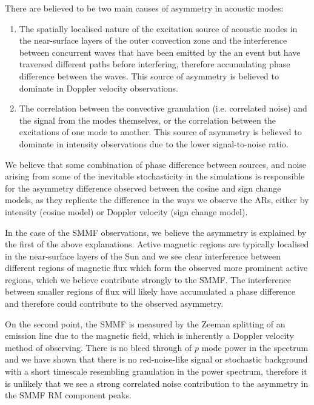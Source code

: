 There are believed to be two main causes of asymmetry in acoustic modes:

\begin{enumerate}
	\item{The spatially localised nature of the excitation source of acoustic modes in the near-surface layers of the outer convection zone and the interference between concurrent waves that have been emitted by the an event but have traversed different paths before interfering, therefore accumulating phase difference between the waves. This source of asymmetry is believed to dominate in Doppler velocity observations.}
	
	\item{The correlation between the convective granulation (i.e. correlated noise) and the signal from the modes themselves, or the correlation between the excitations of one mode to another. This source of asymmetry is believed to dominate in intensity observations due to the lower signal-to-noise ratio.}
\end{enumerate}

We believe that some combination of phase difference between sources, and noise arising from some of the inevitable stochasticity in the simulations is responsible for the asymmetry difference observed between the cosine and sign change models, as they replicate the difference in the ways we observe the ARs, either by intensity (cosine model) or Doppler velocity (sign change model).

In the case of the SMMF observations, we believe the asymmetry is explained by the first of the above explanations. Active magnetic regions are typically localised in the near-surface layers of the Sun and we see clear interference between different regions of magnetic flux which form the observed more prominent active regions, which we believe contribute strongly to the SMMF. The interference between smaller regions of flux will likely have accumulated a phase difference and therefore could contribute to the observed asymmetry. 

On the second point, the SMMF is measured by the Zeeman splitting of an emission line due to the magnetic field, which is inherently a Doppler velocity method of observing. There is no bleed through of $p$ mode power in the spectrum and we have shown that there is no red-noise-like signal or stochastic background with a short timescale resembling granulation in the power spectrum, therefore it is unlikely that we see a strong correlated noise contribution to the asymmetry in the SMMF RM component peaks.

